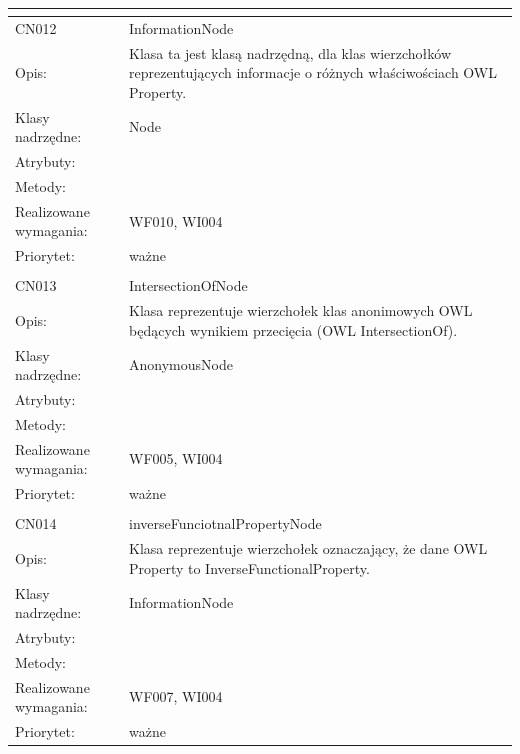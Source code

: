 \documentclass[a4paper,10pt]{article}
\begin{document}
\begin{center}
\begin{longtable}{|m{3cm}|m{9cm}|}
\multicolumn{2}{c}{} \\
 \hline

CN012 & InformationNode \\ \hline
Opis: & Klasa ta jest klasą nadrzędną, dla klas wierzchołków reprezentujących informacje o różnych właściwościach OWL Property.    \\ \hline
Klasy nadrzędne: & Node     \\ \hline
Atrybuty: & %
 \\ \hline
Metody: & %
  \\ \hline
Realizowane wymagania: & WF010, WI004 \\ \hline
Priorytet: & ważne  \\ \hline

\multicolumn{2}{c}{} \\
 \hline

CN013 & IntersectionOfNode \\ \hline
Opis: & Klasa reprezentuje wierzchołek klas anonimowych OWL będących wynikiem przecięcia (OWL IntersectionOf).    \\ \hline
Klasy nadrzędne: & AnonymousNode     \\ \hline
Atrybuty: & %
 \\ \hline
Metody: & %
  \\ \hline
Realizowane wymagania: & WF005, WI004 \\ \hline
Priorytet: & ważne  \\ \hline

\multicolumn{2}{c}{} \\
 \hline

CN014 & inverseFunciotnalPropertyNode \\ \hline
Opis: & Klasa reprezentuje wierzchołek oznaczający, że dane OWL Property to InverseFunctionalProperty.    \\ \hline
Klasy nadrzędne: & InformationNode     \\ \hline
Atrybuty: & %
 \\ \hline
Metody: & %
  \\ \hline
Realizowane wymagania: & WF007, WI004 \\ \hline
Priorytet: & ważne  \\ \hline


\end{longtable}
\end{center}
\end{document}
